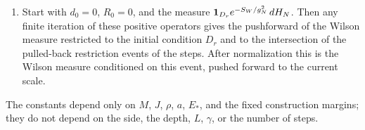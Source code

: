 \begin{theorem}
\begin{enumerate}
\[
 V_c(w)=\tfrac12\abs w^2+H_{d_0,J}(\theta,w)+R(e^{\varphi_\theta(w)})-R_{\mathrm{ref}}(c),\qquad
 A_{\mathrm{coord}}=\prod_i\mathcal J_i(I,0)g_i^{3f_i}.
\]
With respect to the product Haar measure $dH$ on the coarse configuration,
\begin{equation}\label{ch10:eq:one-step-formula}
\begin{split}
 &(T_M^J)_*(\one_{\mathrm{cut}}P_{\mathrm{in}}\,dH)\\
 &\qquad=\one_{D_r}(c)\,A_{\mathrm{coord}}\,e^{-E_{d_0+J,\mathrm{sat}}(c)/g_J^2-\mathsf B_{\mathrm{ref},\mathrm{sat}}(c)-R_{\mathrm{ref},\mathrm{sat}}(c)}\Bigl(\int_{\Omega_p}e^{-V_c(w)}\,dw\Bigr)\,dH(c).
\end{split}
\end{equation}
The right side is defined by gluing the whole expression across charts. The terms $\mathsf B_{\mathrm{ref}}$ and $R_{\mathrm{ref}}$ need not be separately gauge invariant, and the subscript $\mathrm{sat}$ on them is notation for the glued expression. Every indicator in $\one_{\mathrm{cut}}$ is kept in its definition; the support-inclusion hypothesis shows that the indicator of $D_r$ for the fine field equals one on the domain of integration.
\item Start with $d_0=0$, $R_0=0$, and the measure $\mathbf 1_{D_r}e^{-S_W/g_N^2}\,dH_N$. Then any finite iteration of these positive operators gives the pushforward of the Wilson measure restricted to the initial condition $D_r$ and to the intersection of the pulled-back restriction events of the steps. After normalization this is the Wilson measure conditioned on this event, pushed forward to the current scale.
\end{enumerate}
The constants depend only on $M$, $J$, $\rho$, $a$, $E_*$, and the fixed construction margins; they do not depend on the side, the depth, $L$, $\gamma$, or the number of steps.
\end{theorem}

